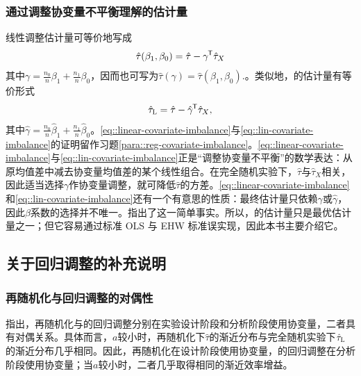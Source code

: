  
\subsubsection{通过调整协变量不平衡理解\citet{lin2013}的估计量}
\label{sec::lin=adjustingforimbalance}

线性调整估计量可等价地写成
\begin{eqnarray}\label{eq::linear-covariate-imbalance}
\hat{\tau}(\beta_1, \beta_0) = \hat{\tau} - \gamma^{\mkern-1.5mu\mathsf{T}} \hat{\tau}_X 
\end{eqnarray}
其中$\gamma =\frac{n_0}{n} \beta_1 + \frac{n_1}{n} \beta_0$，因而也可写为$\hat{\tau}(\gamma) = 
\hat{\tau}(\beta_1, \beta_0) .$。类似地，\citet{lin2013}的估计量有等价形式
\begin{eqnarray}\label{eq::lin-covariate-imbalance}
\hat{\tau}_\textsc{L} = \hat{\tau} - \hat \gamma^{\mkern-1.5mu\mathsf{T}} \hat{\tau}_X ,
\end{eqnarray}
其中$\hat \gamma =\frac{n_0}{n} \hat \beta_1 + \frac{n_1}{n} \hat  \beta_0$。\eqref{eq::linear-covariate-imbalance}与\eqref{eq::lin-covariate-imbalance}的证明留作习题\ref{para::reg-covariate-imbalance}。\eqref{eq::linear-covariate-imbalance}与\eqref{eq::lin-covariate-imbalance}正是“调整协变量不平衡”的数学表达：从原均值差中减去协变量均值差的某个线性组合。在完全随机实验下，$\hat{\tau} $与$\hat{\tau}_X $相关，因此适当选择$\gamma$作协变量调整，就可降低$\hat{\tau} $的方差。\eqref{eq::linear-covariate-imbalance}和\eqref{eq::lin-covariate-imbalance}还有一个有意思的性质：最终估计量只依赖$\gamma$或$\hat \gamma$，因此$\beta$系数的选择并不唯一。\citet{li2019rerandomization}指出了这一简单事实。所以，\citet{lin2013}的估计量只是最优估计量之一；但它容易通过标准 OLS 与 EHW 标准误实现，因此本书主要介绍它。 



\subsection{关于回归调整的补充说明}


\subsubsection{再随机化与回归调整的对偶性}\citet{li2018asymptotic}指出，再随机化与\citet{lin2013}的回归调整分别在实验设计阶段和分析阶段使用协变量，二者具有对偶关系。具体而言，$a$较小时，再随机化下$\hat{\tau}$的渐近分布与完全随机实验下$\hat{\tau}_\textsc{L}$的渐近分布几乎相同。因此，再随机化在设计阶段使用协变量，\citet{lin2013}的回归调整在分析阶段使用协变量；当$a$较小时，二者几乎取得相同的渐近效率增益。 


